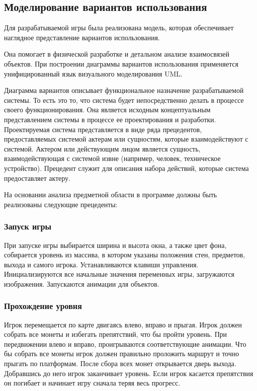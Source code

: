 \subsection{Моделирование вариантов использования}

Для разрабатываемой игры была реализована модель, которая обеспечивает наглядное представление вариантов использования.

Она помогает в физической разработке и детальном анализе взаимосвязей объектов. При построении диаграммы вариантов использования применяется унифицированный язык визуального моделирования UML.

Диаграмма вариантов описывает функциональное назначение разрабатываемой системы. То есть это то, что система будет непосредственно делать в процессе своего функционирования. Она является исходным концептуальным представлением системы в процессе ее проектирования и разработки. Проектируемая система представляется в виде ряда прецедентов, предоставляемых системой актерам или сущностям, которые взаимодействуют с системой. Актером или действующим лицом является сущность, взаимодействующая с системой извне (например, человек, техническое устройство). Прецедент служит для описания набора действий, которые система предоставляет актеру.

На основании анализа предметной области в программе должны быть реализованы следующие прецеденты:
\subsubsection{Запуск игры}

При запуске игры выбирается ширина и высота окна, а также цвет фона, собирается уровень из массива, в котором указаны положения стен, предметов, выхода и самого игрока. Устанавливаются клавиши управления. Инициализируются все начальные значения переменных игры, загружаются изображения. Запускаются анимации для объектов.

\subsubsection{Прохождение уровня}

Игрок перемещается по карте двигаясь влево, вправо и прыгая. Игрок должен собрать все монеты и избегать препятствий, что бы пройти уровень. При передвижении влево и вправо, проигрываются соответствующие анимации. Что бы собрать все монеты игрок должен правильно проложить маршрут и точно прыгать по платформам. После сбора всех монет открывается дверь выхода. Добравшись до него игрок заканчивает уровень. Если игрок касается препятствия он погибает и начинает игру сначала теряя весь прогресс.

